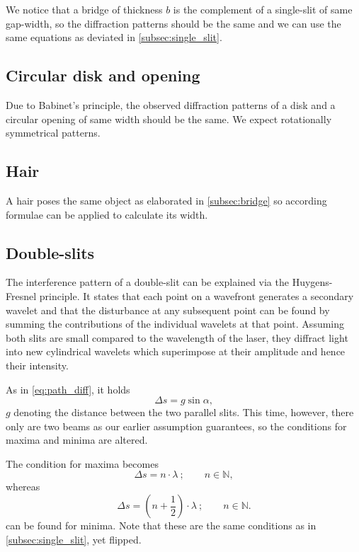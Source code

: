 We notice that a bridge of thickness $b$ is the complement of a single-slit of same gap-width, so the diffraction patterns should be the same and we can use the same equations as deviated in \autoref{subsec:single_slit}.

\subsection{Circular disk and opening}
Due to Babinet's principle, the observed diffraction patterns of a disk and a circular opening of same width should be the same.
We expect rotationally symmetrical patterns.

\subsection{Hair}
A hair poses the same object as elaborated in \autoref{subsec:bridge} so according formulae can be applied to calculate its width.

\subsection{Double-slits}
The interference pattern of a double-slit can be explained via the Huygens-Fresnel principle.
It states that each point on a wavefront generates a secondary wavelet and that the disturbance at any subsequent point can be found by summing the contributions of the individual wavelets at that point.
Assuming both slits are small compared to the wavelength of the laser, they diffract light into new cylindrical wavelets which superimpose at their amplitude and hence their intensity.

As in \autoref{eq:path_diff}, it holds
\begin{equation*}
	\Delta s=g\sin\alpha,
\end{equation*}
$g$ denoting the distance between the two parallel slits.
This time, however, there only are two beams as our earlier assumption guarantees, so the conditions for maxima and minima are altered.

The condition for maxima becomes
\begin{equation}\label{eq:double_path_max}
	\Delta s = n\cdot\lambda\ ;\qquad n\in\mathbb{N},
\end{equation}
whereas
\begin{equation}\label{eq:double_path_min}
	\Delta s = \left(n+\frac{1}{2}\right)\cdot\lambda\ ;\qquad n\in\mathbb{N}.
\end{equation}
can be found for minima.
Note that these are the same conditions as in \autoref{subsec:single_slit}, yet flipped. 

